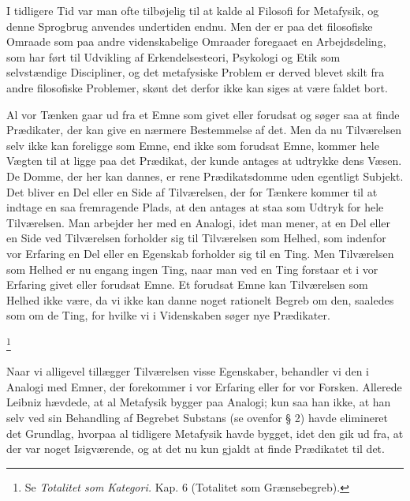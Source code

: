 \documentclass[12pt]{article}
\newcommand{\apage}[1]{\marginnote{\footnotesize\textit{[#1]}}}
\begin{document}
I tidligere Tid var man ofte tilbøjelig til at kalde al Filosofi for Metafysik,
og denne Sprogbrug anvendes undertiden endnu. Men der er paa det filosofiske
Omraade som paa andre videnskabelige Omraader foregaaet en Arbejdsdeling, som
har ført til Udvikling af Erkendelsesteori, Psykologi og Etik som selvstændige
Discipliner, og det metafysiske Problem er derved blevet skilt fra andre
filosofiske Problemer, skønt det derfor ikke kan siges at være faldet bort.

Al vor Tænken gaar ud fra et Emne som givet eller forudsat og søger saa at
finde Prædikater, der kan give en nærmere Bestemmelse af det. Men da nu
Tilværelsen selv ikke kan foreligge som Emne, end ikke som forudsat Emne,
kommer hele Vægten til at ligge paa det Prædikat, der kunde antages at udtrykke
dens Væsen. De Domme, der her kan dannes, er rene Prædikatsdomme uden egentligt
Subjekt. Det bliver en Del eller en Side af Tilværelsen,
\setcounter{footnote}{0}%
\apage{83}der for Tænkere kommer til at indtage en saa fremragende Plads, at
den antages at staa som Udtryk for hele Tilværelsen. Man arbejder her med en
Analogi, idet man mener, at en Del eller en Side ved Tilværelsen forholder sig
til Tilværelsen som Helhed, som indenfor vor Erfaring en Del eller en Egenskab
forholder sig til en Ting. Men Tilværelsen som Helhed er nu engang ingen
\guillemotright{}Ting\guillemotleft{}, naar man ved en Ting forstaar et i vor
Erfaring givet eller forudsat Emne. Et forudsat Emne kan Tilværelsen som Helhed
ikke være, da vi ikke kan danne noget rationelt Begreb om den, saaledes som om
de \guillemotright{}Ting\guillemotleft{}, for hvilke vi i Videnskaben søger nye
Prædikater.

         \footnote{Se \textit{Totalitet som Kategori.} Kap. 6 (Totalitet som
Grænsebegreb).}

       Naar vi alligevel tillægger Tilværelsen visse Egenskaber, behandler vi
den i Analogi med Emner, der forekommer i vor Erfaring eller for vor Forsken.
Allerede Leibniz hævdede, at al Metafysik bygger paa Analogi; kun saa han ikke,
at han selv ved sin Behandling af Begrebet Substans (se ovenfor § 2) havde
elimineret det Grundlag, hvorpaa al tidligere Metafysik havde bygget, idet den
gik ud fra, at der var noget \guillemotright{}Isigværende\guillemotleft{}, og
at det nu kun gjaldt at finde Prædikatet til det.
\end{document}
